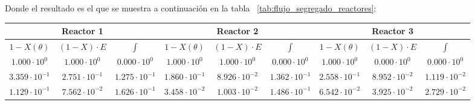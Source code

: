 \noindent Donde el resultado es el que se muestra a continuación en la tabla ~\ref{tab:flujo_segregado_reactores}:
\begin{table}[H]
	\centering
	\small
	\renewcommand{\arraystretch}{1.2}
	\setlength{\tabcolsep}{4pt}
	\begin{tabular}{|ccc|ccc|ccc|}
		\hline
		\multicolumn{3}{|c|}{\textbf{Reactor 1}} & \multicolumn{3}{c|}{\textbf{Reactor 2}} & \multicolumn{3}{c|}{\textbf{Reactor 3}}                                                                                                                                                                                                                                                                           \\
		\hline
		$1-X(\theta)$                            & $(1-X)\cdot E$                          & $\int$                                              & $1-X(\theta)$          & $(1-X)\cdot E$         & $\int$                                              & $1-X(\theta)$                                                        & $(1-X)\cdot E$         & $\int$                                              \\
		\hline
		$1.000 \cdot 10^{0}$                     & $1.000 \cdot 10^{0}$                    & $0.000 \cdot 10^{0}$                                & $1.000 \cdot 10^{0}$   & $1.000 \cdot 10^{0}$   & $0.000 \cdot 10^{0}$                                & $1.000 \cdot 10^{0}$                                                 & $0.000 \cdot 10^{0}$   & $0.000 \cdot 10^{0}$                                \\
		$3.359 \cdot 10^{-1}$                    & $2.751 \cdot 10^{-1}$                   & $1.275 \cdot 10^{-1}$                               & $1.860 \cdot 10^{-1}$  & $8.926 \cdot 10^{-2}$  & $1.362 \cdot 10^{-1}$                               & $2.558 \cdot 10^{-1}$                                                & $8.952 \cdot 10^{-2}$  & $1.119 \cdot 10^{-2}$                               \\
		$1.129 \cdot 10^{-1}$                    & $7.562 \cdot 10^{-2}$                   & $1.626 \cdot 10^{-1}$                               & $3.458 \cdot 10^{-2}$  & $1.003 \cdot 10^{-2}$  & $1.486 \cdot 10^{-1}$                               & $6.542 \cdot 10^{-2}$                                                & $3.925 \cdot 10^{-2}$  & $2.729 \cdot 10^{-2}$                               \\

\end{tabular}
\end{table}
